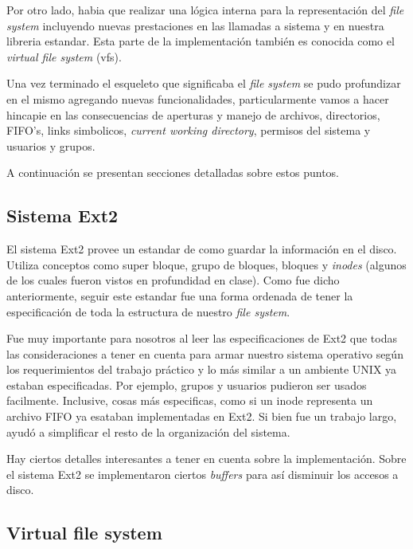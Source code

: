 \documentclass[a4paper,10pt]{article}
\begin{document}
    Por otro lado, habia que realizar una lógica interna para la representación del \textit{file system}
    incluyendo nuevas prestaciones en las llamadas a sistema y en nuestra libreria estandar. Esta parte de la 
    implementación también es conocida como el \textit{virtual file system} (vfs).

    Una vez terminado el esqueleto que significaba el \textit{file system} se pudo profundizar en el mismo agregando
    nuevas funcionalidades, particularmente vamos a hacer hincapie en las consecuencias de aperturas y manejo de
    archivos, directorios, FIFO's, links simbolicos, \textit{current working
    directory}, permisos del sistema y usuarios y grupos.

    A continuación se presentan secciones detalladas sobre estos puntos.

    \subsection{Sistema Ext2}
    El sistema Ext2 provee un estandar de como guardar la información en el disco. Utiliza conceptos como super bloque, 
    grupo de bloques, bloques y \textit{inodes} (algunos de los cuales fueron vistos en profundidad en clase). Como fue
    dicho anteriormente, seguir este estandar fue una forma ordenada de tener la especificación de toda la estructura
    de nuestro \textit{file system}.

    Fue muy importante para nosotros al leer las especificaciones de Ext2 que todas las consideraciones a tener en cuenta
    para armar nuestro sistema operativo según los requerimientos del trabajo práctico y lo más similar a un ambiente
    UNIX ya estaban especificadas. Por ejemplo, grupos y usuarios pudieron ser usados facilmente. Inclusive, cosas más
    especificas, como si un inode representa un archivo FIFO ya esataban implementadas en Ext2. Si bien fue un trabajo
    largo, ayudó a simplificar el resto de la organización del sistema.

    Hay ciertos detalles interesantes a tener en cuenta sobre la implementación. Sobre el sistema Ext2 se implementaron
    ciertos \textit{buffers} para así disminuir los accesos a disco.
    
    \subsection{Virtual file system}
    
\end{document}
